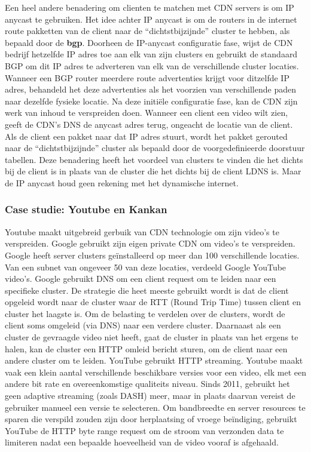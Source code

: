 \noindent Een heel andere benadering om clienten te matchen met CDN servers is om IP anycast te gebruiken. Het idee achter IP anycast is om de routers in de internet route pakketten van de client naar de “dichtstbijzijnde” cluster te hebben, als bepaald door de \textbf{\acrfull{bgp}}. Doorheen de IP-anycast configuratie fase, wijst de CDN bedrijf hetzelfde IP adres toe aan elk van zijn clusters en gebruikt de standaard BGP om dit IP adres te adverteren van elk van de verschillende cluster locaties. Wanneer een BGP router meerdere route advertenties krijgt voor ditzelfde IP adres, behandeld het deze advertenties als het voorzien van verschillende paden naar dezelfde fysieke locatie. Na deze initiële configuratie fase, kan de CDN zijn werk van inhoud te verspreiden doen. Wanneer een client een video wilt zien, geeft de CDN’s DNS de anycast adres terug, ongeacht de locatie van de client. Als de client een pakket naar dat IP adres stuurt, wordt het pakket gerouted naar de “dichtstbijzijnde” cluster als bepaald door de voorgedefinieerde doorstuur tabellen.
Deze benadering heeft het voordeel van clusters te vinden die het dichts bij de client is in plaats van de cluster die het dichts bij de client LDNS is. Maar de IP anycast houd geen rekening met het dynamische internet.



\subsubsection{Case studie: Youtube en Kankan}


Youtube maakt uitgebreid gerbuik van CDN technologie om zijn video’s te verspreiden. Google gebruikt zijn eigen private CDN om video’s te verspreiden. Google heeft server clusters geïnstalleerd op meer dan 100 verschillende locaties. Van een subnet van ongeveer 50 van deze locaties, verdeeld Google YouTube video’s. Google gebruikt DNS om een client request om te leiden naar een specifieke cluster. De strategie die heet meeste gebruikt wordt is dat de client opgeleid wordt naar de cluster waar de RTT (Round Trip Time) tussen client en cluster het laagste is. Om de belasting te verdelen over de clusters, wordt de client soms omgeleid (via DNS) naar een verdere cluster. Daarnaast als een cluster de gevraagde video niet heeft, gaat de cluster in plaats van het ergens te halen, kan de cluster een HTTP omleid bericht sturen, om de client naar een andere cluster om te leiden. YouTube gebruikt HTTP streaming. Youtube maakt vaak een klein aantal verschillende beschikbare versies voor een video, elk met een andere bit rate en overeenkomstige qualiteits niveau. Sinds 2011, gebruikt het geen adaptive streaming (zoals DASH) meer, maar in plaats daarvan vereist de gebruiker manueel een versie te selecteren. Om bandbreedte en server resources te sparen die verspild zouden zijn door herplaatsing of vroege beïndiging, gebruikt YouTube de HTTP byte range request om de stroom van verzonden data te limiteren nadat een bepaalde hoeveelheid van de video vooraf is afgehaald.

